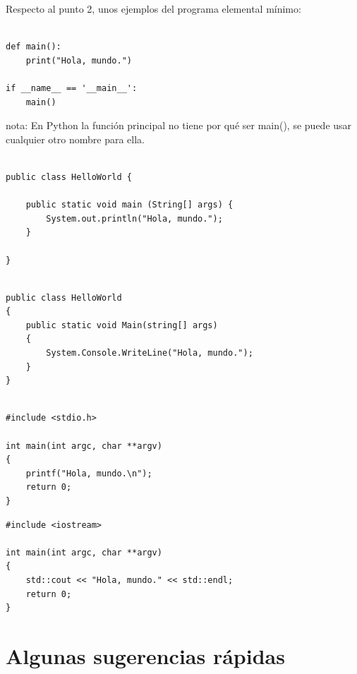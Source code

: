 \documentclass[spanish,12pt,a4paper,final,oneside]{book}
\begin{document}
\vspace{0.5cm}
Respecto al punto 2, unos ejemplos del programa elemental mínimo:
\vspace{0.3cm}

\begin{lstlisting}[frame=single, caption=lenguaje Python]

def main():
    print("Hola, mundo.")

if __name__ == '__main__':
    main()

\end{lstlisting}
\begin{scriptsize}
nota: En Python la función principal no tiene por qué ser main(), se puede usar cualquier otro nombre para ella.
\end{scriptsize}


\begin{lstlisting}[frame=single, caption=lenguaje Java]

public class HelloWorld {
	
    public static void main (String[] args) {
        System.out.println("Hola, mundo.");
    }
	
}

\end{lstlisting}


\begin{lstlisting}[frame=single, caption=lenguaje C\#]

public class HelloWorld
{
    public static void Main(string[] args)
    {
        System.Console.WriteLine("Hola, mundo.");
    }
}
    
\end{lstlisting}


\begin{lstlisting}[frame=single, caption=lenguaje C]
#include <stdio.h>

int main(int argc, char **argv)
{
    printf("Hola, mundo.\n");
    return 0;
}

\end{lstlisting}


\begin{lstlisting}[frame=single, caption=lenguaje C++]
#include <iostream>

int main(int argc, char **argv)
{
	std::cout << "Hola, mundo." << std::endl;
	return 0;
}

\end{lstlisting}

\vspace{2cm}

\section{Algunas sugerencias rápidas}
\end{document}
